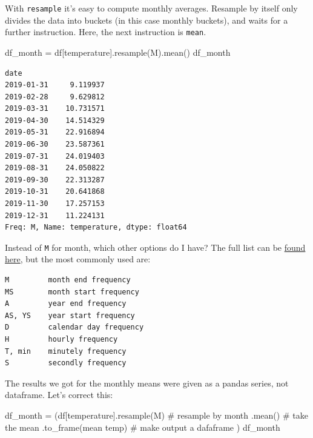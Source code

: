 \documentclass[
  letterpaper,
  DIV=11,
  numbers=noendperiod,
  oneside]{scrreprt}
\newenvironment{Shaded}{\begin{snugshade}}{\end{snugshade}}
\newcommand{\CommentTok}[1]{\textcolor[rgb]{0.37,0.37,0.37}{#1}}
\newcommand{\NormalTok}[1]{\textcolor[rgb]{0.00,0.23,0.31}{#1}}
\newcommand{\OperatorTok}[1]{\textcolor[rgb]{0.37,0.37,0.37}{#1}}
\newcommand{\StringTok}[1]{\textcolor[rgb]{0.13,0.47,0.30}{#1}}
\begin{document}
With \texttt{resample} it's easy to compute monthly averages. Resample
by itself only divides the data into buckets (in this case monthly
buckets), and waits for a further instruction. Here, the next
instruction is \texttt{mean}.

\begin{Shaded}
\begin{Highlighting}[]
\NormalTok{df\_month }\OperatorTok{=}\NormalTok{ df[}\StringTok{\textquotesingle{}temperature\textquotesingle{}}\NormalTok{].resample(}\StringTok{\textquotesingle{}M\textquotesingle{}}\NormalTok{).mean()}
\NormalTok{df\_month}
\end{Highlighting}
\end{Shaded}

\begin{verbatim}
date
2019-01-31     9.119937
2019-02-28     9.629812
2019-03-31    10.731571
2019-04-30    14.514329
2019-05-31    22.916894
2019-06-30    23.587361
2019-07-31    24.019403
2019-08-31    24.050822
2019-09-30    22.313287
2019-10-31    20.641868
2019-11-30    17.257153
2019-12-31    11.224131
Freq: M, Name: temperature, dtype: float64
\end{verbatim}

Instead of \texttt{M} for month, which other options do I have? The full
list can be
\href{https://pandas.pydata.org/pandas-docs/stable/user_guide/timeseries.html\#offset-aliases}{found
here}, but the most commonly used are:

\begin{verbatim}
M         month end frequency
MS        month start frequency
A         year end frequency
AS, YS    year start frequency
D         calendar day frequency
H         hourly frequency
T, min    minutely frequency
S         secondly frequency
\end{verbatim}

The results we got for the monthly means were given as a pandas series,
not dataframe. Let's correct this:

\begin{Shaded}
\begin{Highlighting}[]
\NormalTok{df\_month }\OperatorTok{=}\NormalTok{ (df[}\StringTok{\textquotesingle{}temperature\textquotesingle{}}\NormalTok{].resample(}\StringTok{\textquotesingle{}M\textquotesingle{}}\NormalTok{)         }\CommentTok{\# resample by month}
\NormalTok{                             .mean()                }\CommentTok{\# take the mean}
\NormalTok{                             .to\_frame(}\StringTok{\textquotesingle{}mean temp\textquotesingle{}}\NormalTok{) }\CommentTok{\# make output a dafaframe}
\NormalTok{           )}
\NormalTok{df\_month}
\end{Highlighting}
\end{Shaded}
\end{document}
